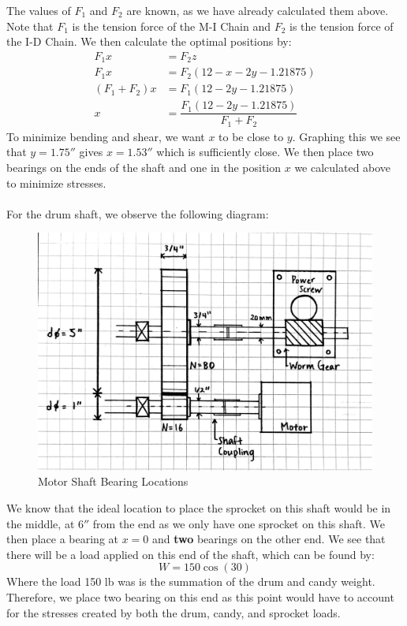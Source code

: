 \documentclass[letterpaper,12pt]{article}
\begin{document}
\noindent The values of $F_1$ and $F_2$ are known, as we have already calculated them above. Note that $F_1$ is the tension force of the M-I Chain and $F_2$ is the tension force of the I-D Chain. We then calculate the optimal positions by:
\begin{align*}
    F_1x &= F_2z \\
    F_1x &= F_2(12-x-2y-1.21875) \\
    (F_1 + F_2)x &= F_1(12-2y-1.21875) \\
    x &= \dfrac{F_1(12-2y-1.21875)}{F_1 + F_2}
\end{align*}
To minimize bending and shear, we want $x$ to be close to $y$. Graphing this we see that $y=1.75''$ gives $x=1.53''$ which is sufficiently close. We then place two bearings on the ends of the shaft and one in the position $x$ we calculated above to minimize stresses. \\\\
For the drum shaft, we observe the following diagram:
\begin{figure}[!ht]
\includegraphics[width=16cm]{MECH325A1System}
\caption{Motor Shaft Bearing Locations}
\end{figure}

\noindent We know that the ideal location to place the sprocket on this shaft would be in the middle, at $6''$ from the end as we only have one sprocket on this shaft. We then place a bearing at $x=0$ and \textbf{two} bearings on the other end. We see that there will be a load applied on this end of the shaft, which can be found by:
\begin{equation*}
    W = 150\cos(30)
\end{equation*}
Where the load 150 lb was is the summation of the drum and candy weight. Therefore, we place two bearing on this end as this point would have to account for the stresses created by both the drum, candy, and sprocket loads.
\end{document}
